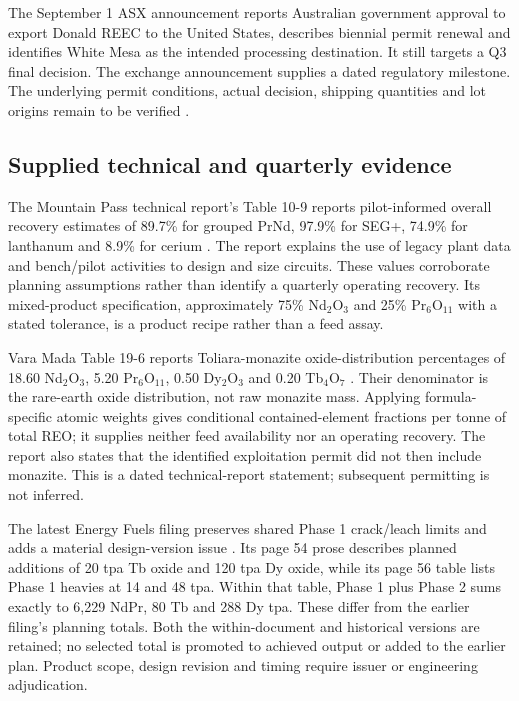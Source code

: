 \documentclass[11pt]{article}
\begin{document}
The September 1 ASX announcement reports Australian government approval to export Donald REEC to the United States, describes biennial permit renewal and identifies White Mesa as the intended processing destination. It still targets a Q3 final decision. The exchange announcement supplies a dated regulatory milestone. The underlying permit conditions, actual decision, shipping quantities and lot origins remain to be verified \citep{AstronDonaldPermit2026}.

\subsection{Supplied technical and quarterly evidence}
The Mountain Pass technical report's Table 10-9 reports pilot-informed overall recovery estimates of 89.7\% for grouped PrNd, 97.9\% for SEG+, 74.9\% for lanthanum and 8.9\% for cerium \citep{MPTRS2026}. The report explains the use of legacy plant data and bench/pilot activities to design and size circuits. These values corroborate planning assumptions rather than identify a quarterly operating recovery. Its mixed-product specification, approximately 75\% Nd$_2$O$_3$ and 25\% Pr$_6$O$_{11}$ with a stated tolerance, is a product recipe rather than a feed assay.

Vara Mada Table 19-6 reports Toliara-monazite oxide-distribution percentages of 18.60 Nd$_2$O$_3$, 5.20 Pr$_6$O$_{11}$, 0.50 Dy$_2$O$_3$ and 0.20 Tb$_4$O$_7$ \citep{VaraTRS2026}. Their denominator is the rare-earth oxide distribution, not raw monazite mass. Applying formula-specific atomic weights gives conditional contained-element fractions per tonne of total REO; it supplies neither feed availability nor an operating recovery. The report also states that the identified exploitation permit did not then include monazite. This is a dated technical-report statement; subsequent permitting is not inferred.

The latest Energy Fuels filing preserves shared Phase 1 crack/leach limits and adds a material design-version issue \citep{EFQ22026}. Its page 54 prose describes planned additions of 20 tpa Tb oxide and 120 tpa Dy oxide, while its page 56 table lists Phase 1 heavies at 14 and 48 tpa. Within that table, Phase 1 plus Phase 2 sums exactly to 6,229 NdPr, 80 Tb and 288 Dy tpa. These differ from the earlier filing's planning totals. Both the within-document and historical versions are retained; no selected total is promoted to achieved output or added to the earlier plan. Product scope, design revision and timing require issuer or engineering adjudication.
\end{document}
